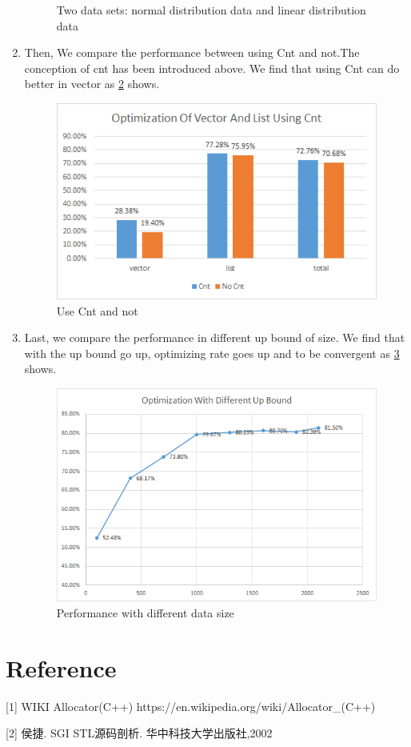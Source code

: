 \documentclass{article}
\begin{document}
\begin{enumerate}
\begin{figure}
		\caption{Two data sets: normal distribution data and linear distribution data\label{TestResult2}}
	\end{figure}
	\item
	Then, We compare the performance between using Cnt and not.The conception of cnt has been introduced above.
	We find that using Cnt can do better in vector as \ref{TestResult3} shows.
	\begin{figure}
		\centering
		\includegraphics[]{figure2.png}
		\caption{Use Cnt and not\label{TestResult3}}
	\end{figure}
	\item
	Last, we compare the performance in different up bound of size. We find that with the up bound go up, optimizing rate goes up and to be convergent as \ref{TestResult4} shows.
	\begin{figure}
		\centering
		\includegraphics[]{figure3.png}
		\caption{Performance with different data size\label{TestResult4}}
	\end{figure}
\end{enumerate}

\section{Reference}

[1] WIKI Allocator(C++) https://en.wikipedia.org/wiki/Allocator\_(C++)

[2] 侯捷. SGI STL源码剖析. 华中科技大学出版社,2002
\end{document}
